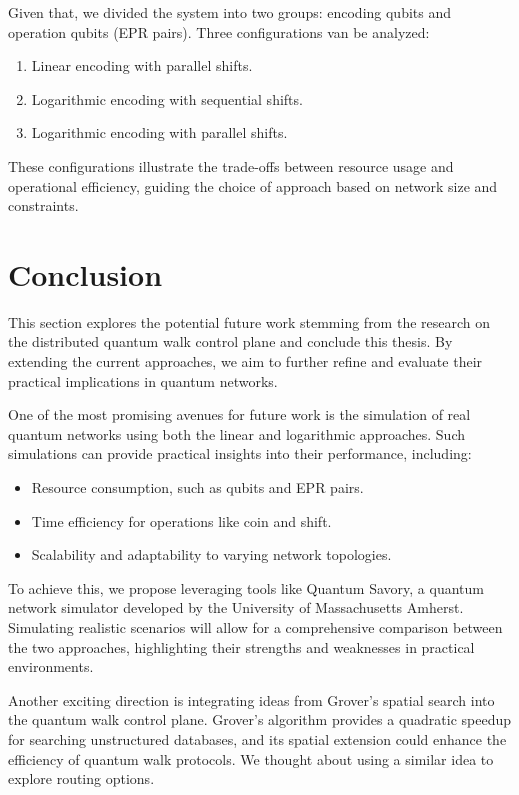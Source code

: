\documentclass{article}
\begin{document}
		Given that, we divided the system into two groups: encoding qubits and operation qubits (EPR pairs). Three configurations van be analyzed:
		\begin{enumerate}
			\item Linear encoding with parallel shifts.
			\item Logarithmic encoding with sequential shifts.
			\item Logarithmic encoding with parallel shifts.
		\end{enumerate}
		
		These configurations illustrate the trade-offs between resource usage and operational efficiency, guiding the choice of approach based on network size and constraints.
		
\newpage

\section{Conclusion}

	This section explores the potential future work stemming from the research on the distributed quantum walk control plane and conclude this thesis. By extending the current approaches, we aim to further refine and evaluate their practical implications in quantum networks.

	One of the most promising avenues for future work is the simulation of real quantum networks using both the linear and logarithmic approaches. Such simulations can provide practical insights into their performance, including:
	\begin{itemize}
		\item Resource consumption, such as qubits and EPR pairs.
		\item Time efficiency for operations like coin and shift.
		\item Scalability and adaptability to varying network topologies.
	\end{itemize}

	To achieve this, we propose leveraging tools like Quantum Savory, a quantum network simulator developed by the University of Massachusetts Amherst. Simulating realistic scenarios will allow for a comprehensive comparison between the two approaches, highlighting their strengths and weaknesses in practical environments.

	Another exciting direction is integrating ideas from Grover's spatial search into the quantum walk control plane. Grover's algorithm provides a quadratic speedup for searching unstructured databases, and its spatial extension could enhance the efficiency of quantum walk protocols. We thought about using a similar idea to explore routing options.
\end{document}
